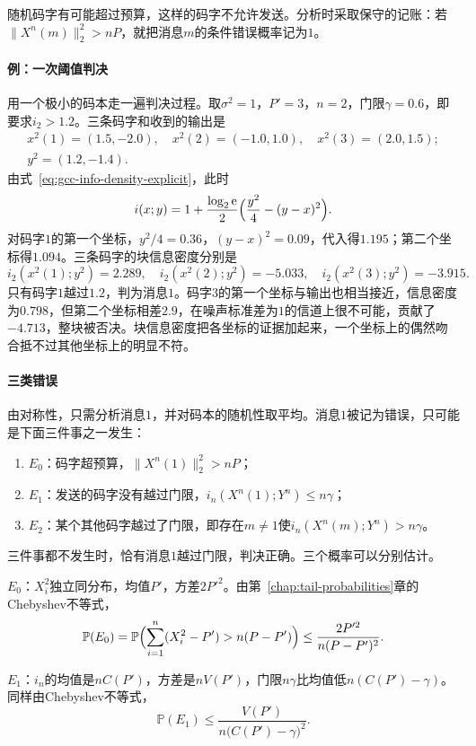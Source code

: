 随机码字有可能超过预算，这样的码字不允许发送。分析时采取保守的记账：若$\lVert X^n(m)\rVert_2^2>nP$，就把消息$m$的条件错误概率记为$1$。

\paragraph{例：一次阈值判决}
用一个极小的码本走一遍判决过程。取$\sigma^2=1$，$P'=3$，$n=2$，门限$\gamma=0.6$，即要求$i_2>1.2$。三条码字和收到的输出是
\[
 \begin{gathered}
  x^2(1)=(1.5,-2.0),\quad x^2(2)=(-1.0,1.0),\quad x^2(3)=(2.0,1.5);\\
  y^2=(1.2,-1.4) .
 \end{gathered}
\]
由式~\eqref{eq:gcc-info-density-explicit}，此时
\[
 i(x;y)=1+\frac{\log_2\mathrm{e}}{2}\Bigl(\frac{y^2}{4}-(y-x)^2\Bigr) .
\]
对码字$1$的第一个坐标，$y^2/4=0.36$，$(y-x)^2=0.09$，代入得$1.195$；第二个坐标得$1.094$。三条码字的块信息密度分别是
\[
 i_2(x^2(1);y^2)=2.289,\quad i_2(x^2(2);y^2)=-5.033,\quad i_2(x^2(3);y^2)=-3.915 .
\]
只有码字$1$越过$1.2$，判为消息$1$。码字$3$的第一个坐标与输出也相当接近，信息密度为$0.798$，但第二个坐标相差$2.9$，在噪声标准差为$1$的信道上很不可能，贡献了$-4.713$，整块被否决。块信息密度把各坐标的证据加起来，一个坐标上的偶然吻合抵不过其他坐标上的明显不符。

\paragraph{三类错误}
由对称性，只需分析消息$1$，并对码本的随机性取平均。消息$1$被记为错误，只可能是下面三件事之一发生：
\begin{enumerate}
 \item $E_0$：码字超预算，$\lVert X^n(1)\rVert_2^2>nP$；
 \item $E_1$：发送的码字没有越过门限，$i_n(X^n(1);Y^n)\leq n\gamma$；
 \item $E_2$：某个其他码字越过了门限，即存在$m\neq1$使$i_n(X^n(m);Y^n)>n\gamma$。
\end{enumerate}
三件事都不发生时，恰有消息$1$越过门限，判决正确。三个概率可以分别估计。

$E_0$：$X_i^2$独立同分布，均值$P'$，方差$2P'^2$。由第~\ref{chap:tail-probabilities}章的Chebyshev不等式，
\[
 \mathbb{P}(E_0)=\mathbb{P}\Bigl(\sum_{i=1}^{n}(X_i^2-P')>n(P-P')\Bigr)\leq\frac{2P'^2}{n(P-P')^2} .
\]

$E_1$：$i_n$的均值是$nC(P')$，方差是$nV(P')$，门限$n\gamma$比均值低$n(C(P')-\gamma)$。同样由Chebyshev不等式，
\[
 \mathbb{P}(E_1)\leq\frac{V(P')}{n\bigl(C(P')-\gamma\bigr)^2} .
\]

